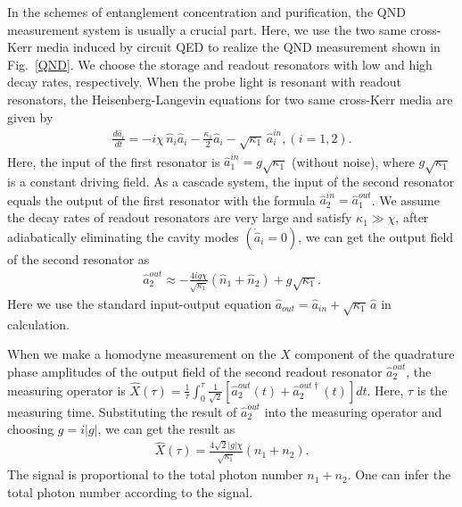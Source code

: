 \documentclass[preprintnumbers,showkeys,amsmath,amssymb]{revtex4}%
\begin{document}
In the schemes of entanglement concentration and purification, the QND
measurement system is usually a crucial part. Here, we use the two
same cross-Kerr media induced by circuit QED to realize the QND
measurement shown in Fig.~\ref{QND}. We choose the storage and
readout resonators with low and high decay rates, respectively. When
the probe light is resonant with readout resonators, the
Heisenberg-Langevin equations for two same cross-Kerr media are
given by
\begin{eqnarray}\label{HLequation}
\frac{d\hat{a}_{i}}{dt}=-i\chi\,\hat{n}_{i}\hat{a}_{i}-\frac{\kappa_{1}}{2}\hat{a}_{i}-\sqrt{\kappa_{1}}\,\hat{a}^{in}_{i},(i=1, 2).
\end{eqnarray}
Here, the input of the first resonator is
$\hat{a}^{in}_{1}=g\sqrt{\kappa_{1}}$ (without noise), where
$g\sqrt{\kappa_{1}}$ is a constant driving field. As a cascade
system, the input of the second resonator equals the output of
the first resonator with the formula
$\hat{a}^{in}_{2}=\hat{a}^{out}_{1}$. We assume the decay rates of
readout resonators are very large and satisfy $\kappa_{1}\gg\chi$,
after adiabatically eliminating the cavity modes
$(\dot{\hat{a}}_{i}=0)$, we can get the output field of the second
resonator as
\begin{eqnarray}        \label{ouput2}
\hat{a}^{out}_{2}\approx-\frac{4ig\chi}{\sqrt{\kappa_{1}}}(\hat{n}_{1}+\hat{n}_{2})+g\sqrt{\kappa_{1}}.
\end{eqnarray}
Here we use the standard input-output equation
$\hat{a}_{out}=\hat{a}_{in}+\sqrt{\kappa_{1}}\,\hat{a}$ in
calculation.



When we make a homodyne measurement on the $X$ component of the
quadrature phase amplitudes of the output field of the second
readout resonator $\hat{a}^{out}_{2}$, the measuring operator is
$\hat{X}(\tau)=\frac{1}{\tau}\int^{\tau}_{0}\frac{1}{\sqrt{2}}[\hat{a}^{out}_{2}(t)+\hat{a}^{out\dag}_{2}(t)]dt$.
Here, $\tau$ is the measuring time. Substituting the result of
$\hat{a}^{out}_{2}$ into the measuring operator and choosing
$g=i|g|$, we can get the result as
\begin{eqnarray}        \label{measurement}
\hat{X}(\tau)=\frac{4\sqrt{2}|g|\chi}{\sqrt{\kappa_{1}}}(n_{1}+n_{2}).
\end{eqnarray}
The signal is proportional to the total photon number $n_{1}+n_{2}$.
One can infer the total photon number according to the signal.
\end{document}
